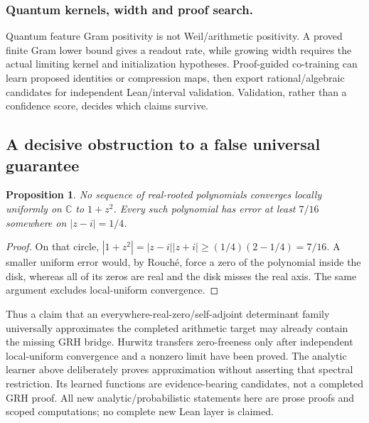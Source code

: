 \documentclass[11pt,oneside,openany]{book}
\newtheorem{proposition}[theorem]{Proposition}
\theoremstyle{definition}\newtheorem{definition}[theorem]{Definition}
\theoremstyle{remark}\newtheorem{remark}[theorem]{Remark}
\begin{document}
\subsubsection{Quantum kernels, width and proof search.}
Quantum feature Gram positivity is not Weil/arithmetic positivity. A proved
finite Gram lower bound gives a readout rate, while growing width requires
the actual limiting kernel and initialization hypotheses. Proof-guided
co-training can learn proposed identities or compression maps, then export
rational/algebraic candidates for independent Lean/interval validation.
Validation, rather than a confidence score, decides which claims survive.

\subsection{A decisive obstruction to a false universal guarantee}
\begin{proposition}\label{hl:real-root-floor}
No sequence of real-rooted polynomials converges locally uniformly on
$\mathbb C$ to $1+z^2$. Every such polynomial has error at least $7/16$
somewhere on $|z-i|=1/4$.
\end{proposition}
\begin{proof}
On that circle, $|1+z^2|=|z-i||z+i|\ge(1/4)(2-1/4)=7/16$.
A smaller uniform error would, by Rouch\'e, force a zero of the polynomial
inside the disk, whereas all of its zeros are real and the disk misses the
real axis. The same argument excludes local-uniform convergence.
\end{proof}
Thus a claim that an everywhere-real-zero/self-adjoint determinant family
universally approximates the completed arithmetic target may already contain
the missing GRH bridge. Hurwitz transfers zero-freeness only after independent
local-uniform convergence and a nonzero limit have been proved. The analytic
learner above deliberately proves approximation without asserting that
spectral restriction. Its learned functions are evidence-bearing candidates,
not a completed GRH proof. All new analytic/probabilistic statements here are
prose proofs and scoped computations; no complete new Lean layer is claimed.
\end{document}
